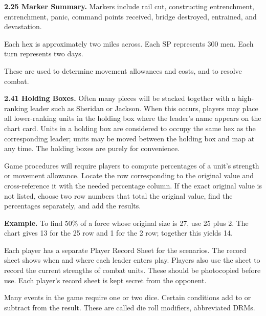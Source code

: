 \textbf{2.25 Marker Summary.} Markers include rail cut, constructing entrenchment, entrenchment, panic, command points received, bridge destroyed, entrained, and devastation.


Each hex is approximately two miles across. Each SP represents 300 men. Each turn represents two days.


These are used to determine movement allowances and costs, and to resolve combat.

\textbf{2.41 Holding Boxes.} Often many pieces will be stacked together with a high-ranking leader such as Sheridan or Jackson. When this occurs, players may place all lower-ranking units in the holding box where the leader's name appears on the chart card. Units in a holding box are considered to occupy the same hex as the corresponding leader; units may be moved between the holding box and map at any time. The holding boxes are purely for convenience.


Game procedures will require players to compute percentages of a unit's strength or movement allowance. Locate the row corresponding to the original value and cross-reference it with the needed percentage column. If the exact original value is not listed, choose two row numbers that total the original value, find the percentages separately, and add the results.

\textbf{Example.} To find 50\% of a force whose original size is 27, use 25 plus 2. The chart gives 13 for the 25 row and 1 for the 2 row; together this yields 14.


Each player has a separate Player Record Sheet for the scenarios. The record sheet shows when and where each leader enters play. Players also use the sheet to record the current strengths of combat units. These should be photocopied before use. Each player's record sheet is kept secret from the opponent.


Many events in the game require one or two dice. Certain conditions add to or subtract from the result. These are called die roll modifiers, abbreviated DRMs.
